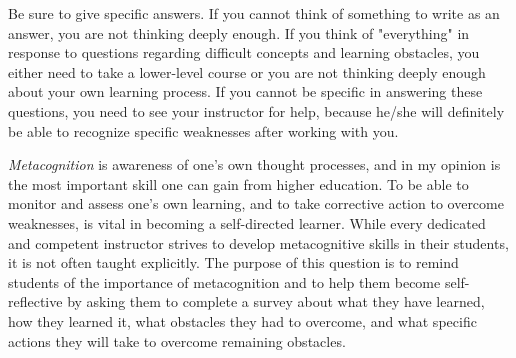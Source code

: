 
Be sure to give specific answers.  If you cannot think of something to write as an answer, you are not thinking deeply enough.  If you think of "everything" in response to questions regarding difficult concepts and learning obstacles, you either need to take a lower-level course or you are not thinking deeply enough about your own learning process.  If you cannot be specific in answering these questions, you need to see your instructor for help, because he/she will definitely be able to recognize specific weaknesses after working with you.







{\it Metacognition} is awareness of one's own thought processes, and in my opinion is the most important skill one can gain from higher education.  To be able to monitor and assess one's own learning, and to take corrective action to overcome weaknesses, is vital in becoming a self-directed learner.  While every dedicated and competent instructor strives to develop metacognitive skills in their students, it is not often taught explicitly.  The purpose of this question is to remind students of the importance of metacognition and to help them become self-reflective by asking them to complete a survey about what they have learned, how they learned it, what obstacles they had to overcome, and what specific actions they will take to overcome remaining obstacles.




